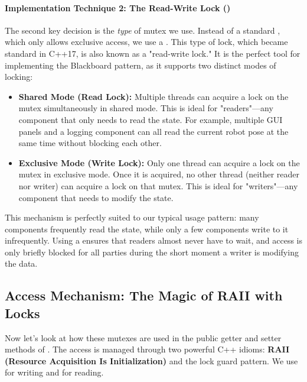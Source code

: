 
\paragraph{Implementation Technique 2: The Read-Write Lock ()}
The second key decision is the \textit{type} of mutex we use. Instead of a standard , which only allows exclusive access, we use a \textbf{}. This type of lock, which became standard in C++17, is also known as a "read-write lock." It is the perfect tool for implementing the Blackboard pattern, as it supports two distinct modes of locking:

\begin{itemize}
    \item \textbf{Shared Mode (Read Lock):} Multiple threads can acquire a lock on the mutex simultaneously in shared mode. This is ideal for "readers"—any component that only needs to read the state. For example, multiple GUI panels and a logging component can all read the current robot pose at the same time without blocking each other.
    \item \textbf{Exclusive Mode (Write Lock):} Only one thread can acquire a lock on the mutex in exclusive mode. Once it is acquired, no other thread (neither reader nor writer) can acquire a lock on that mutex. This is ideal for "writers"—any component that needs to modify the state.
\end{itemize}

This mechanism is perfectly suited to our typical usage pattern: many components frequently read the state, while only a few components write to it infrequently. Using a  ensures that readers almost never have to wait, and access is only briefly blocked for all parties during the short moment a writer is modifying the data.

\subsection{Access Mechanism: The Magic of RAII with Locks}
\label{subsec:statedata-access}

Now let's look at how these mutexes are used in the public getter and setter methods of . The access is managed through two powerful C++ idioms: \textbf{RAII (Resource Acquisition Is Initialization)} and the lock guard pattern. We use  for writing and  for reading.

